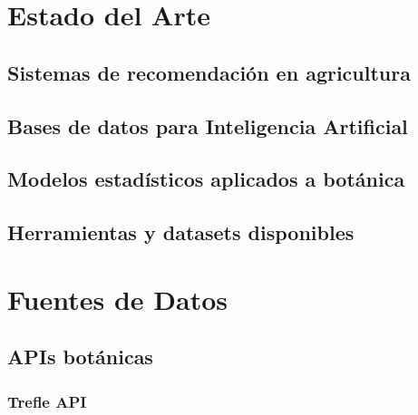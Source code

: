 \documentclass[12pt, a4paper]{article}
\begin{document}
\section{Estado del Arte}
\label{sec:estado_arte}

\subsection{Sistemas de recomendación en agricultura}

\subsection{Bases de datos para Inteligencia Artificial}

\subsection{Modelos estadísticos aplicados a botánica}

\subsection{Herramientas y datasets disponibles}

\section{Fuentes de Datos}
\label{sec:datos}

\subsection{APIs botánicas}

\subsubsection{Trefle API}
\end{document}
